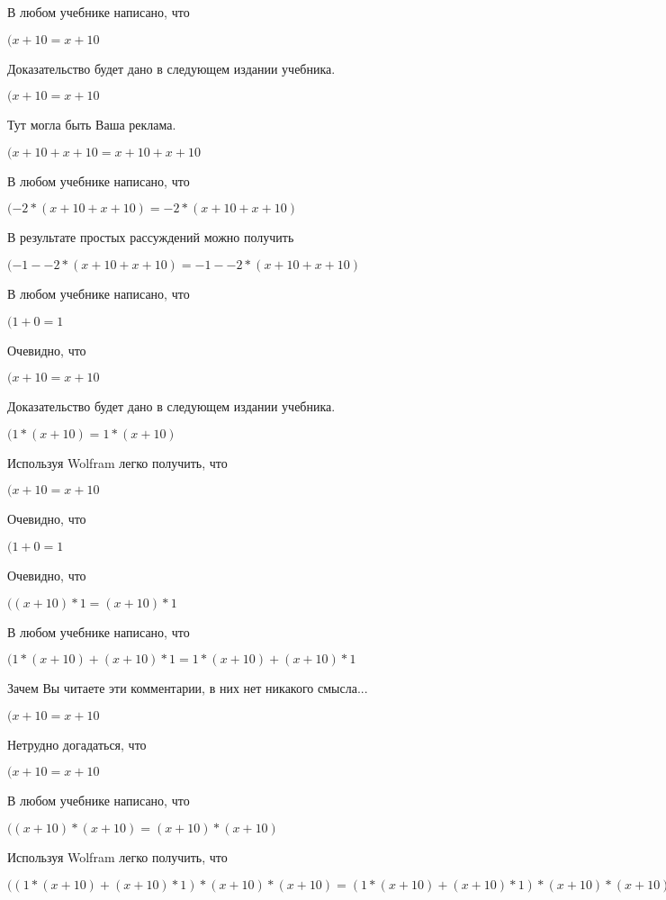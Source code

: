 \documentclass[12pt,a4paper,fleqn]{article}
\theoremstyle{definition}
\begin{document}
В любом учебнике написано, что

$( x  +  10  =  x  +  10 $

Доказательство будет дано в следующем издании учебника.

$( x  +  10  =  x  +  10 $

Тут могла быть Ваша реклама.

$( x  +  10  +  x  +  10  =  x  +  10  +  x  +  10 $

В любом учебнике написано, что

$( -2  * ( x  +  10  +  x  +  10 ) =  -2  * ( x  +  10  +  x  +  10 )$

В результате простых рассуждений можно получить

$( -1  -  -2  * ( x  +  10  +  x  +  10 ) =  -1  -  -2  * ( x  +  10  +  x  +  10 )$

В любом учебнике написано, что

$( 1  +  0  =  1 $

Очевидно, что

$( x  +  10  =  x  +  10 $

Доказательство будет дано в следующем издании учебника.

$( 1  * ( x  +  10 ) =  1  * ( x  +  10 )$

Используя Wolfram легко получить, что

$( x  +  10  =  x  +  10 $

Очевидно, что

$( 1  +  0  =  1 $

Очевидно, что

$(( x  +  10 ) *  1  = ( x  +  10 ) *  1 $

В любом учебнике написано, что

$( 1  * ( x  +  10 ) + ( x  +  10 ) *  1  =  1  * ( x  +  10 ) + ( x  +  10 ) *  1 $

Зачем Вы читаете эти комментарии, в них нет никакого смысла...

$( x  +  10  =  x  +  10 $

Нетрудно догадаться, что

$( x  +  10  =  x  +  10 $

В любом учебнике написано, что

$(( x  +  10 ) * ( x  +  10 ) = ( x  +  10 ) * ( x  +  10 )$

Используя Wolfram легко получить, что

$(( 1  * ( x  +  10 ) + ( x  +  10 ) *  1 ) * ( x  +  10 ) * ( x  +  10 ) = ( 1  * ( x  +  10 ) + ( x  +  10 ) *  1 ) * ( x  +  10 ) * ( x  +  10 )$
\end{document}
